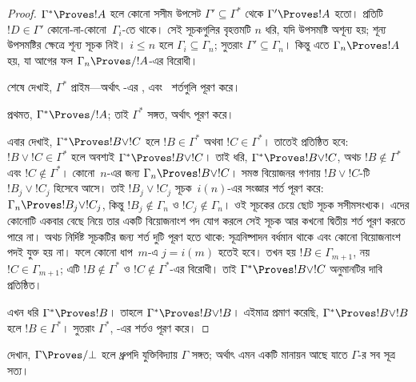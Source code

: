 \documentclass[../../../include/open-logic-section]{subfiles}
\begin{document}
\begin{proof}
  $\Gamma^* \Proves !A$ হলে কোনো সসীম উপসেট $\Gamma'
  \subseteq \Gamma^*$ থেকে $\Gamma' \Proves !A$ হতো। প্রতিটি
  $!D \in \Gamma'$ কোনো-না-কোনো~$\Gamma_i$-তে থাকে। সেই সূচকগুলির
  বৃহত্তমটি $n$ ধরি, যদি উপসমষ্টি অশূন্য হয়; শূন্য উপসমষ্টির ক্ষেত্রে শূন্য সূচক নিই। $i \le n$ হলে $\Gamma_i \subseteq \Gamma_n$;
  সুতরাং $\Gamma' \subseteq \Gamma_n$। কিন্তু এতে
  $\Gamma_n \Proves !A$ হয়, যা আগের ফল
  $\Gamma_n \Proves/ !A$-এর বিরোধী।

  শেষে দেখাই, $\Gamma^*$ প্রাইম—অর্থাৎ
  -এর ,
   এবং~ শর্তগুলি পূরণ করে।

  প্রথমত, $\Gamma^* \Proves/ !A$; তাই $\Gamma^*$ সঙ্গত,
  অর্থাৎ  পূরণ করে।

  এবার দেখাই, $\Gamma^* \Proves !B \lor !C$ হলে
  $!B \in \Gamma^*$ অথবা $!C \in \Gamma^*$। তাতেই
   প্রতিষ্ঠিত হবে: $!B \lor !C \in \Gamma^*$
  হলে অবশ্যই $\Gamma^* \Proves !B \lor !C$। তাই ধরি,
  $\Gamma^* \Proves !B \lor !C$, অথচ $!B \notin \Gamma^*$ এবং
  $!C \notin \Gamma^*$। কোনো~$n$-এর জন্য
  $\Gamma_n \Proves !B \lor !C$। সমস্ত বিয়োজনর গণনায়
  $!B \lor !C$-টি $!B_j \lor !C_j$ হিসেবে আসে। তাই
  $!B_j \lor !C_j$ সূচক~$i(n)$-এর সংজ্ঞার শর্ত পূরণ করে:
  $\Gamma_n \Proves !B_j \lor !C_j$, কিন্তু
  $!B_j \notin \Gamma_n$ ও $!C_j \notin \Gamma_n$।
  ওই সূচকের চেয়ে ছোট সূচক সসীমসংখ্যক। এদের কোনোটি একবার বেছে নিয়ে
  তার একটি বিয়োজনাংশ পদ যোগ করলে সেই সূচক আর কখনো দ্বিতীয় শর্ত
  পূরণ করতে পারে না। অথচ নির্দিষ্ট সূচকটির জন্য শর্ত দুটি পূরণ হতে থাকে:
  সূত্রনিষ্পাদন বর্ধমান থাকে এবং কোনো বিয়োজনাংশ পদই যুক্ত হয় না।
  ফলে কোনো ধাপ~$m$-এ $j = i(m)$ হতেই হবে। তখন হয়
  $!B \in \Gamma_{m+1}$, নয় $!C \in \Gamma_{m+1}$;
  এটি $!B \notin \Gamma^*$ ও $!C \notin \Gamma^*$-এর বিরোধী।
  তাই $\Gamma^* \Proves !B \lor !C$ অনুমানটির দাবি প্রতিষ্ঠিত।

  এখন ধরি $\Gamma^* \Proves !B$। তাহলে
  $\Gamma^* \Proves !B \lor !B$। এইমাত্র প্রমাণ করেছি,
  $\Gamma^* \Proves !B \lor !B$ হলে $!B \in \Gamma^*$।
  সুতরাং $\Gamma^*$, -এর
   শর্তও পূরণ করে।
\end{proof}

\begin{prob}
  দেখান, $\Gamma \Proves/ \bot$ হলে ধ্রুপদি যুক্তিবিদ্যায়
  $\Gamma$ সঙ্গত; অর্থাৎ এমন একটি মানায়ন আছে যাতে
  $\Gamma$-র সব সূত্র সত্য।
\end{prob}
\end{document}
